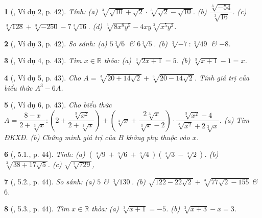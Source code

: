 \documentclass{article}
\newtheorem{baitoan}{}%
\begin{document}
\begin{baitoan}[\cite{Binh_boi_duong_Toan_9_tap_1}, Ví dụ 2, p. 42]
	Tính: (a) $\sqrt[3]{\sqrt{10} + \sqrt{2}}\cdot\sqrt[3]{\sqrt{2} - \sqrt{10}}$. (b) $\dfrac{\sqrt[3]{-54}}{\sqrt[3]{16}}$. (c) $\sqrt[3]{128} + \sqrt[3]{-250} - 7\sqrt[3]{16}$. (d) $\sqrt[3]{8x^8y^5} - 4xy\sqrt[3]{x^5y^2}$.
\end{baitoan}

\begin{baitoan}[\cite{Binh_boi_duong_Toan_9_tap_1}, Ví dụ 3, p. 42]
	So sánh: (a) $5\sqrt[3]{6}$ \& $6\sqrt[3]{5}$. (b) $\sqrt[3]{-7}:\sqrt[3]{49}$ \& $-8$.
\end{baitoan}

\begin{baitoan}[\cite{Binh_boi_duong_Toan_9_tap_1}, Ví dụ 4, p. 43]
	Tìm $x\in\mathbb{R}$ thỏa: (a) $\sqrt[3]{2x + 1} = 5$. (b) $\sqrt[3]{x + 1} - 1 = x$.
\end{baitoan}

\begin{baitoan}[\cite{Binh_boi_duong_Toan_9_tap_1}, Ví dụ 5, p. 43]
	Cho $A = \sqrt[3]{20 + 14\sqrt{2}} + \sqrt[3]{20 - 14\sqrt{2}}$. Tính giá trị của biểu thức $A^3 - 6A$.
\end{baitoan}

\begin{baitoan}[\cite{Binh_boi_duong_Toan_9_tap_1}, Ví dụ 6, p. 43]
	Cho biểu thức $A = \dfrac{8 - x}{2 + \sqrt[3]{x}}:\left(2 + \dfrac{\sqrt[3]{x^2}}{2 + \sqrt[3]{x}}\right) + \left(\sqrt[3]{x} + \dfrac{2\sqrt[3]{x}}{\sqrt[3]{x} - 2}\right)\cdot\dfrac{\sqrt[3]{x^2} - 4}{\sqrt[3]{x^2} + 2\sqrt[3]{x}}$. (a) Tìm {\rm ĐKXĐ}. (b) Chứng minh giá trị của $B$ không phụ thuộc vào $x$.
\end{baitoan}

\begin{baitoan}[\cite{Binh_boi_duong_Toan_9_tap_1}, 5.1., p. 44]
	Tính: (a) $(\sqrt[3]{9} + \sqrt[3]{6} + \sqrt[3]{4})(\sqrt[3]{3} - \sqrt[3]{2})$. (b) $\sqrt[3]{38 + 17\sqrt{5}}$. (c) $\sqrt{\sqrt[3]{729}}$,
\end{baitoan}

\begin{baitoan}[\cite{Binh_boi_duong_Toan_9_tap_1}, 5.2., p. 44]
	So sánh: (a) $5$ \& $\sqrt[3]{130}$. (b) $\sqrt{122 - 22\sqrt{2}} + \sqrt[3]{77\sqrt{2} - 155}$ \& $6$.
\end{baitoan}

\begin{baitoan}[\cite{Binh_boi_duong_Toan_9_tap_1}, 5.3., p. 44]
	Tìm $x\in\mathbb{R}$ thỏa: (a) $\sqrt[3]{x + 1} = -5$. (b) $\sqrt[3]{x + 3} - x = 3$.
\end{baitoan}
\end{document}

